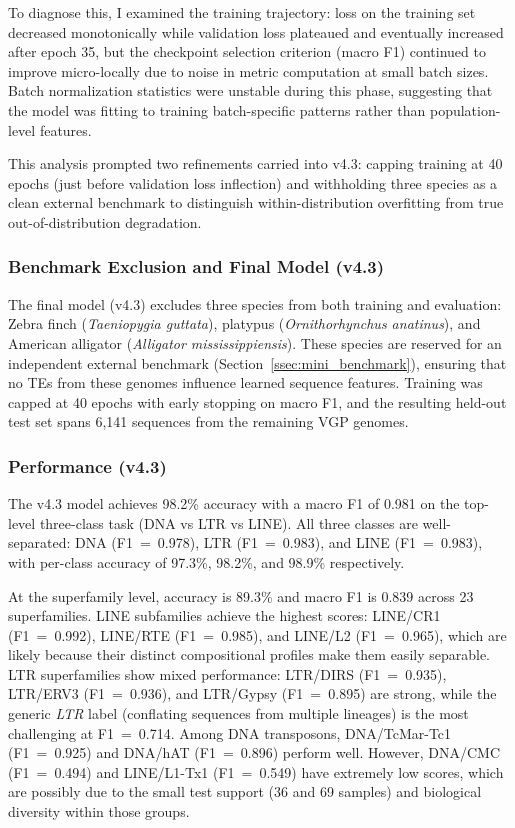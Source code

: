 \documentclass[12pt]{article}
\begin{document}
To diagnose this, I examined the training trajectory: loss on the training set decreased monotonically while validation loss plateaued and eventually increased after epoch 35, but the checkpoint selection criterion (macro F1) continued to improve micro-locally due to noise in metric computation at small batch sizes. Batch normalization statistics were unstable during this phase, suggesting that the model was fitting to training batch-specific patterns rather than population-level features.

This analysis prompted two refinements carried into v4.3: capping training at 40 epochs (just before validation loss inflection) and withholding three species as a clean external benchmark to distinguish within-distribution overfitting from true out-of-distribution degradation.


\subsubsection{Benchmark Exclusion and Final Model (v4.3)}

The final model (v4.3) excludes three species from both training and evaluation: Zebra finch (\textit{Taeniopygia guttata}), platypus (\textit{Ornithorhynchus anatinus}), and American alligator (\textit{Alligator mississippiensis}). These species are reserved for an independent external benchmark (Section~\ref{ssec:mini_benchmark}), ensuring that no TEs from these genomes influence learned sequence features. Training was capped at 40 epochs with early stopping on macro F1, and the resulting held-out test set spans 6,141 sequences from the remaining VGP genomes.

\subsubsection{Performance (v4.3)}

The v4.3 model achieves 98.2\% accuracy with a macro F1 of 0.981 on the top-level three-class task (DNA vs LTR vs LINE). All three classes are well-separated: DNA (F1~=~0.978), LTR (F1~=~0.983), and LINE (F1~=~0.983), with per-class accuracy of 97.3\%, 98.2\%, and 98.9\% respectively.

At the superfamily level, accuracy is 89.3\% and macro F1 is 0.839 across 23 superfamilies. LINE subfamilies achieve the highest scores: LINE/CR1 (F1~=~0.992), LINE/RTE (F1~=~0.985), and LINE/L2 (F1~=~0.965), which are likely because their distinct compositional profiles make them easily separable. LTR superfamilies show mixed performance: LTR/DIRS (F1~=~0.935), LTR/ERV3 (F1~=~0.936), and LTR/Gypsy (F1~=~0.895) are strong, while the generic \textit{LTR} label (conflating sequences from multiple lineages) is the most challenging at F1~=~0.714. Among DNA transposons, DNA/TcMar-Tc1 (F1~=~0.925) and DNA/hAT (F1~=~0.896) perform well. However, DNA/CMC (F1~=~0.494) and LINE/L1-Tx1 (F1~=~0.549) have extremely low scores, which are possibly due to the small test support (36 and 69 samples) and biological diversity within those groups. 
\end{document}
